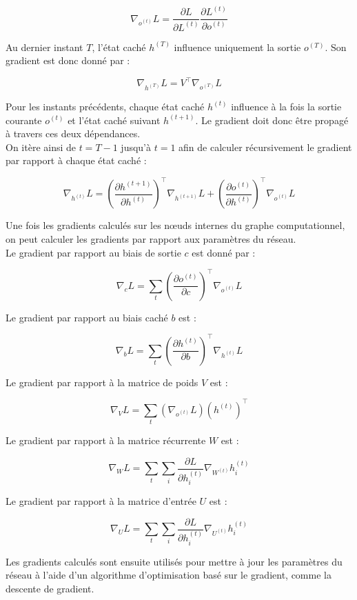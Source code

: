 \documentclass[12pt,a4paper]{report}
\begin{document}
\[
\nabla_{o^{(t)}} L = \frac{\partial L}{\partial L^{(t)}}
\frac{\partial L^{(t)}}{\partial o^{(t)}}
\]

Au dernier instant $T$, l’état caché $h^{(T)}$ influence uniquement la sortie $o^{(T)}$. Son gradient est donc donné par :

\[
\nabla_{h^{(T)}} L = V^\top \nabla_{o^{(T)}} L
\]

Pour les instants précédents, chaque état caché $h^{(t)}$ influence à la fois la sortie courante $o^{(t)}$ et l’état caché suivant $h^{(t+1)}$. Le gradient doit donc être propagé à travers ces deux dépendances.\\

On itère ainsi de $t=T-1$ jusqu’à $t=1$ afin de calculer récursivement le gradient par rapport à chaque état caché :

\[
\nabla_{h^{(t)}} L=\left(\frac{\partial h^{(t+1)}}{\partial h^{(t)}}\right)^\top \nabla_{h^{(t+1)}} L + \left(\frac{\partial o^{(t)}}{\partial h^{(t)}}\right)^\top \nabla_{o^{(t)}} L
\]

Une fois les gradients calculés sur les nœuds internes du graphe computationnel, on peut calculer les gradients par rapport aux paramètres du réseau.\\

Le gradient par rapport au biais de sortie $c$ est donné par :

\[
\nabla_c L
=\sum_t \left(\frac{\partial o^{(t)}}{\partial c}\right)^\top \nabla_{o^{(t)}} L
\]

Le gradient par rapport au biais caché $b$ est :

\[
\nabla_b L
=\sum_t \left(\frac{\partial h^{(t)}}{\partial b} \right)^\top \nabla_{h^{(t)}} L
\]

Le gradient par rapport à la matrice de poids $V$ est :

\[
\nabla_V L
=\sum_t (\nabla_{o^{(t)}} L) (h^{(t)})^\top
\]

Le gradient par rapport à la matrice récurrente $W$ est :

\[
\nabla_W L
=\sum_t \sum_i \frac{\partial L}{\partial h_i^{(t)}} \nabla_{W^{(t)}} h_i^{(t)}
\]

Le gradient par rapport à la matrice d’entrée $U$ est :

\[
\nabla_U L
=\sum_t \sum_i \frac{\partial L}{\partial h_i^{(t)}} \nabla_{U^{(t)}} h_i^{(t)}
\]

Les gradients calculés sont ensuite utilisés pour mettre à jour les paramètres du réseau à l’aide d’un algorithme d’optimisation basé sur le gradient, comme la descente de gradient.\\
\end{document}
